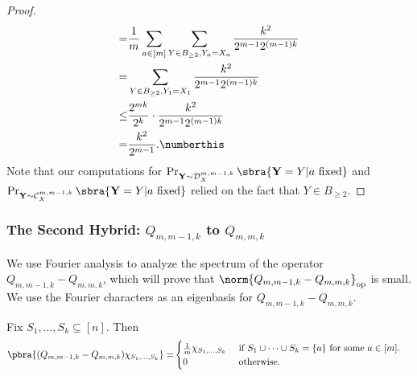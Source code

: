 \begin{proof}
\begin{align*}
        = &\frac1{m}\sum_{a\in[m]}\sum_{Y\in B_{\geq 2},Y_a=X_a} \frac{k^2}{2^{m-1}2^{(m-1)k}}\\
        = &\sum_{Y\in B_{\geq 2},Y_1=X_1} \frac{k^2}{2^{m-1}2^{(m-1)k}}\\
        \leq & \frac{2^{mk}}{2^k}\cdot \frac{k^2}{2^{m-1}2^{(m-1)k}}\\
        =& \frac{k^2}{2^{m-1}}.\numberthis\label{eq:D0 D1 TV}
    \end{align*}
    Note that our computations for $\Pr_{\mathbf{Y}\sim\mathcal{D}^{m,m-1,k}_X}\sbra{\mathbf{Y}=Y|a\text{ fixed}}$ and $\Pr_{\mathbf{Y}\sim\mathcal{C}^{m,m-1,k}_X}\sbra{\mathbf{Y}=Y|a\text{ fixed}}$ relied on the fact that $Y\in B_{\geq 2}$.
\end{proof}




\subsubsection{The Second Hybrid: $Q_{m,m-1,k}$ to $Q_{m,m,k}$}
We use Fourier analysis to analyze the spectrum of the operator $Q_{m,m-1,k}-Q_{m,m,k}$, which will prove that $\norm{Q_{m,m-1,k}-Q_{m,m,k}}_{\mathrm{op}}$ is small. We use the Fourier characters as an eigenbasis for $Q_{m,m-1,k}-Q_{m,m,k}$.
\begin{fact}\label{fact:characters under A1-R1}
    Fix $S_1,\dots,S_k\subseteq[n]$. Then
    \begin{align*}
        \pbra{(Q_{m,m-1,k}-Q_{m,m,k})\chi_{S_1,\dots,S_k}}=&
        \begin{cases}
            \frac1m\chi_{S_1,\dots,S_k} &\text{ if }S_1\cup \dots\cup S_k=\{a\} \text{ for some $a\in [m]$}.\\
            0 &\text{ otherwise.}
        \end{cases}
    \end{align*}
\end{fact}
